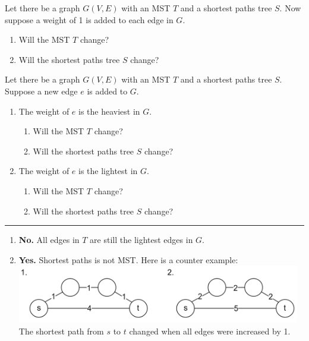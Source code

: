 \newpage

\begin{Exercise} Let there be a graph $G(V,E)$ with an MST $T$ and a shortest paths tree $S$. Now 
    suppose a weight of 1 is added to each edge in $G$.
\begin{enumerate}
    \item Will the MST $T$ change?
    \item Will the shortest paths tree $S$ change?
\end{enumerate}
\end{Exercise} 

\begin{Exercise} Let there be a graph $G(V,E)$ with an MST $T$ and a shortest paths tree $S$.
    Suppose a new edge $e$ is added to $G$.
    \begin{enumerate}
        \item The weight of $e$ is the heaviest in $G$.
            \begin{enumerate}
                \item Will the MST $T$ change?
                \item Will the shortest paths tree $S$ change?
            \end{enumerate}
        \item The weight of $e$ is the lightest in $G$.
            \begin{enumerate}
                \item Will the MST $T$ change?
                \item Will the shortest paths tree $S$ change?
            \end{enumerate}
    \end{enumerate}
\end{Exercise}

\noindent\rule{\textwidth}{0.4pt}

\vspace{1em}
\begin{Answer} 
    \begin{enumerate}
        \item \textbf{No.} All edges in $T$ are still the lightest edges in $G$.
        \item \textbf{Yes.} Shortest paths is not MST. Here is a counter example:\\
        \vspace{1em}
        \includegraphics[height=1in]{./Sections/spanning/counter.png}\\

        \vspace{-2em}
        \noindent
        The shortest path from $s$ to $t$ changed when all edges were increased by 1.
    \end{enumerate}
\end{Answer}


